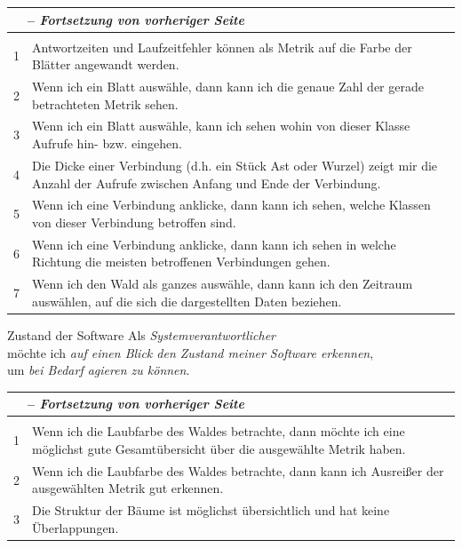 \newcommand{\tableheader}{
\endfirsthead
\multicolumn{2}{l}{\small \tablename\ \thetable\ -- \textit{Fortsetzung von vorheriger Seite}} \\
\hline
  \endhead
  \hline
  \endlastfoot
  \hline
\multicolumn{2}{r}{\textit{\small Fortsetzung auf nächster Seite...}} \\
\endfoot
\hline
}
\renewcommand{\arraystretch}{1.5}
\begin{tabularx}{\textwidth}{lX}
	\caption{Akzeptanzkriterien zu Userstory 1}\label{tab:acceptance1} \\
	\tableheader
    1 & Antwortzeiten und Laufzeitfehler können als Metrik auf die Farbe der Blätter angewandt werden.\\
    2 & Wenn ich ein Blatt auswähle, dann kann ich die genaue Zahl der gerade betrachteten Metrik sehen.\\
    3 & Wenn ich ein Blatt auswähle, kann ich sehen wohin von dieser Klasse Aufrufe hin- bzw. eingehen.\\
    4 & Die Dicke einer Verbindung (d.h. ein Stück Ast oder Wurzel) zeigt mir die Anzahl der Aufrufe zwischen Anfang und Ende der Verbindung.\\
    5 & Wenn ich eine Verbindung anklicke, dann kann ich sehen, welche Klassen von dieser Verbindung betroffen sind.\\
    6 & Wenn ich eine Verbindung anklicke, dann kann ich sehen in welche Richtung die meisten betroffenen Verbindungen gehen.\\
    7 & Wenn ich den Wald als ganzes auswähle, dann kann ich den Zeitraum auswählen, auf die sich die dargestellten Daten beziehen.
\end{tabularx}

\begin{userstory}{Zustand der Software}
  Als \textit{Systemverantwortlicher}\\
  möchte ich \textit{auf einen Blick den Zustand meiner Software erkennen},\\
  um \textit{bei Bedarf agieren zu können}.
\end{userstory}

\begin{tabularx}{\textwidth}{lX}
	\caption{Akzeptanzkriterien zu Userstory 2} \\
	\tableheader
    1 & Wenn ich die Laubfarbe des Waldes betrachte, dann möchte ich eine möglichst gute Gesamtübersicht über die ausgewählte Metrik haben.\\
    2 & Wenn ich die Laubfarbe des Waldes betrachte, dann kann ich Ausreißer der ausgewählten Metrik gut erkennen.\\
    3 & Die Struktur der Bäume ist möglichst übersichtlich und hat keine Überlappungen.
\end{tabularx}

